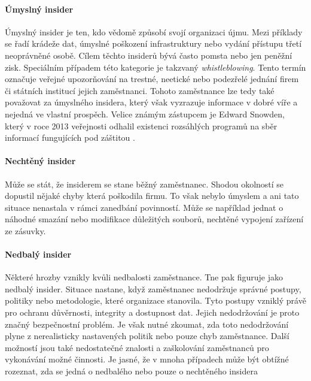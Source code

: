 \paragraph{Úmyslný insider}
Úmyslný insider je ten, kdo vědomě způsobí svojí organizaci újmu.
Mezi příklady se řadí krádeže dat, úmyslné poškození infrastruktury nebo vydání přístupu třetí neoprávněné osobě.
Cílem těchto insiderů bývá často pomsta nebo jen peněžní zisk.
Speciálním případem této kategorie je takzvaný \textit{whistleblowing}.
Tento termín označuje veřejné upozorňování na trestné, neetické nebo podezřelé jednání firem či státních institucí jejich zaměstnanci.
Tohoto zaměstnance lze tedy také považovat za úmyslného insidera, který však vyzrazuje informace v dobré víře a nejedná ve vlastní prospěch.
Velice známým zástupcem je Edward Snowden, který v roce 2013 veřejnosti odhalil existenci rozsáhlých programů na sběr informací fungujících pod záštitou \cite{Edward_Snowden}.

\paragraph{Nechtěný insider}
Může se stát, že insiderem se stane běžný zaměstnanec.
Shodou okolností se dopustil nějaké chyby která poškodila firmu.
To však nebylo úmyslem a ani tato situace nenastala v rámci zanedbání povinností.
Může se například jednat o náhodné smazání nebo modifikace důležitých souborů, nechtěné vypojení zařízení ze zásuvky.

\paragraph{Nedbalý insider}
Některé hrozby vznikly kvůli nedbalosti zaměstnance.
Tne pak figuruje jako nedbalý insider.
Situace nastane, když zaměstnanec nedodržuje správné postupy, politiky nebo metodologie, které organizace stanovila.
Tyto postupy vzniklý právě pro ochranu důvěrnosti, integrity a dostupnost dat.
Jejich nedodržování je proto značný bezpečnostní problém.
Je však nutné zkoumat, zda toto nedodržování plyne z nerealisticky nastavených politik nebo pouze chyb zaměstnance.
Další možností jsou také nedostatečné znalosti a zaškolování zaměstnanců pro vykonávání možné činnosti.
Je jasné, že v mnoha případech může být obtížné rozeznat, zda se jedná o nedbalého nebo pouze o nechtěného insidera


